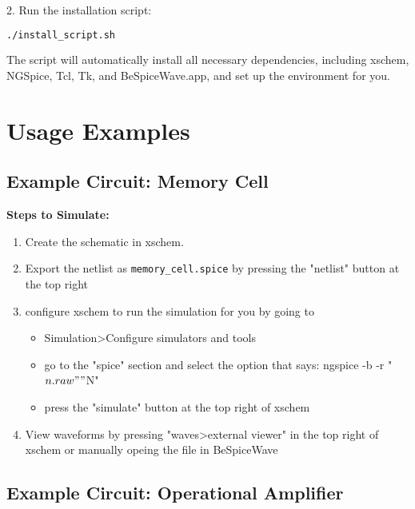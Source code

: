 \documentclass[12pt]{article}
\begin{document}
2. Run the installation script:
    \begin{lstlisting}[language=bash, breaklines=true]
    ./install_script.sh
    \end{lstlisting}

The script will automatically install all necessary dependencies, including xschem, NGSpice, Tcl, Tk, and BeSpiceWave.app, and set up the environment for you.

\section{Usage Examples}
\subsection{Example Circuit: Memory Cell}
\begin{figure}[htbp]
\end{figure}

\textbf{Steps to Simulate:}
\begin{enumerate}
    \item Create the schematic in xschem.
    \item Export the netlist as \texttt{memory\_cell.spice} by pressing the "netlist" button at the top right
    \item configure xschem to run the simulation for you by going to 
	\begin{itemize}
	\item Simulation\textgreater Configure simulators and tools
	\item go to the "spice" section and select the option that says: ngspice -b -r "$n.raw" "$N"
	\item press the "simulate" button at the top right of xschem
\end{itemize}	    
	\item View waveforms by pressing "waves\textgreater external viewer" in the top right of xschem or manually opeing the file in BeSpiceWave
\end{enumerate}

\subsection{Example Circuit: Operational Amplifier}
\begin{figure}[htbp]
\end{figure}
\end{document}

